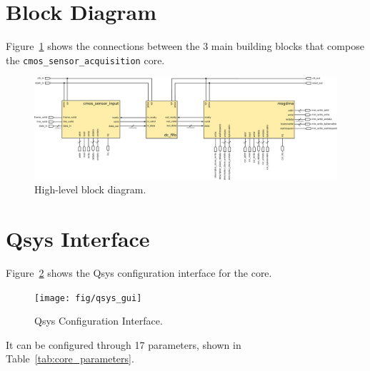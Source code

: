 \documentclass{article}
\def \cmossensoracquisition {\texttt{cmos\_sensor\_acquisition} }
\begin{document}
\newpage

\section{Block Diagram}
Figure~\ref{fig:block_diagram_internal} shows the connections between the 3 main building blocks that compose the \cmossensoracquisition core.

\begin{figure}[h]
    \centering
    \includegraphics[width=1.0\textwidth]{fig/block_diagram_internal}
    \caption{High-level block diagram.}
    \label{fig:block_diagram_internal}
\end{figure}

\section{Qsys Interface}
Figure~\ref{fig:qsys_gui} shows the Qsys configuration interface for the core.
\begin{figure}[h]
    \centering
    \texttt{[image: fig/qsys\_gui]}
    \caption{Qsys Configuration Interface.}
    \label{fig:qsys_gui}
\end{figure}

It can be configured through 17 parameters, shown in Table~\ref{tab:core_parameters}.
\end{document}
